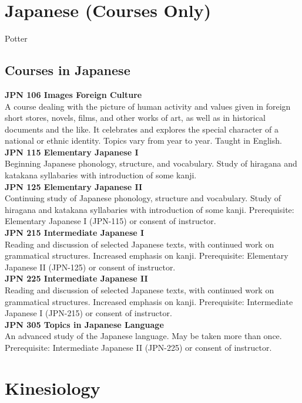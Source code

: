\documentclass[
  letterpaper,
]{scrbook}
\begin{document}
\section{Japanese (Courses Only)}\label{japanese-courses-only}

Potter

\subsection{Courses in Japanese}\label{courses-in-japanese}

\textbf{JPN 106 Images Foreign Culture}\\
A course dealing with the picture of human activity and values given in
foreign short stores, novels, films, and other works of art, as well as
in historical documents and the like. It celebrates and explores the
special character of a national or ethnic identity. Topics vary from
year to year. Taught in English.\\
\textbf{JPN 115 Elementary Japanese I}\\
Beginning Japanese phonology, structure, and vocabulary. Study of
hiragana and katakana syllabaries with introduction of some kanji.\\
\textbf{JPN 125 Elementary Japanese II}\\
Continuing study of Japanese phonology, structure and vocabulary. Study
of hiragana and katakana syllabaries with introduction of some kanji.
Prerequisite: Elementary Japanese I (JPN-115) or consent of
instructor.\\
\textbf{JPN 215 Intermediate Japanese I}\\
Reading and discussion of selected Japanese texts, with continued work
on grammatical structures. Increased emphasis on kanji. Prerequisite:
Elementary Japanese II (JPN-125) or consent of instructor.\\
\textbf{JPN 225 Intermediate Japanese II}\\
Reading and discussion of selected Japanese texts, with continued work
on grammatical structures. Increased emphasis on kanji. Prerequisite:
Intermediate Japanese I (JPN-215) or consent of instructor.\\
\textbf{JPN 305 Topics in Japanese Language}\\
An advanced study of the Japanese language. May be taken more than once.
Prerequisite: Intermediate Japanese II (JPN-225) or consent of
instructor.

\section{Kinesiology}\label{kinesiology}
\end{document}
